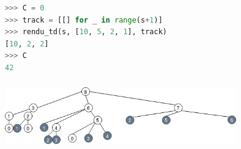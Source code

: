\documentclass[svgnames,11pt]{beamer}
\begin{document}
\begin{frame}[fragile]
    \frametitle{}

\begin{center}
\begin{lstlisting}[language=Python , basicstyle=\ttfamily\small, xleftmargin=2em, xrightmargin=2em]
>>> C = 0
>>> track = [[] for _ in range(s+1)]
>>> rendu_td(s, [10, 5, 2, 1], track)
[10, 2, 2]
>>> C
42
\end{lstlisting}
\label{CODE}
\end{center}

\end{frame}
\begin{frame}
    \frametitle{}

    \begin{center}
    \centering
    \includegraphics[width=10cm]{ressources/appel-dyn-8.png}
    \label{IMG}
    \end{center}

\end{frame}
\end{document}
